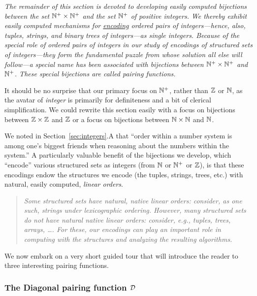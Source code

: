 \smallskip

\noindent
{\em The remainder of this section is devoted to developing {\em
    easily computed} bijections between the set $\mathbb{N}^+ \times \mathbb{N}^+$ and
  the set $\mathbb{N}^+$ of positive integers.  We thereby exhibit easily
  computed mechanisms for \underline{encoding} ordered pairs of
  integers---hence, also, tuples, strings, and binary trees of
  integers---as single integers.  Because of the special role of
  ordered pairs of integers in our study of encodings of structured
  sets of integers---they form the fundamental puzzle from whose
  solution all else will follow---a special name has been associated
  with bijections between $\mathbb{N}^+ \times \mathbb{N}^+$ and $\mathbb{N}^+$.  These
  special bijections are called {\it pairing functions}.}

\noindent
It should be no surprise that our primary focus on $\mathbb{N}^+$, rather than
$\mathbb{Z}$ or $\mathbb{N}$, as the avatar of {\it integer} is primarily for
definiteness and a bit of clerical simplification.  We could rewrite
this section easily with a focus on bijections between $\mathbb{Z} \times \mathbb{Z}$
and $\mathbb{Z}$ or a focus on bijections between $\mathbb{N} \times \mathbb{N}$ and $\mathbb{N}$.

\bigskip

We noted in Section~\ref{sec:integers}.A that ``order within a number
system is among one's biggest friends when reasoning about the numbers
within the system.''  A particularly valuable benefit of the
bijections we develop, which ``encode'' various structured sets as
integers (from $\mathbb{N}$ or $\mathbb{N}^+$ or $\mathbb{Z}$), is that these encodings endow
the structures we encode (the tuples, strings, trees, etc.) with
natural, easily computed, {\em linear orders}.
\begin{quote}
{\em Some structured sets have natural, native linear orders:
  consider, as one such, strings under lexicographic ordering.
  However, many structured sets do not have natural native linear
  orders: consider, e.g., tuples, trees, arrays, \ldots .  For these,
  our encodings can play an important role in computing with the
  structures and analyzing the resulting algorithms. }
\end{quote}

\medskip

We now embark on a very short guided tour that will introduce the
reader to three interesting pairing functions.

\subsubsection{The Diagonal pairing function $\mbox{$\cal D$}$}

